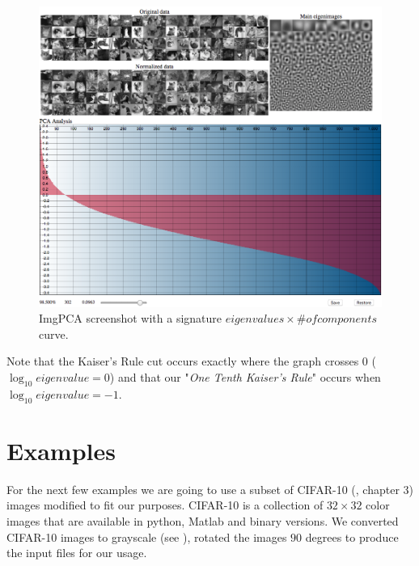 \documentclass{article} %
\begin{document}

\begin{figure}[h]
\begin{center}
\includegraphics[width=\textwidth]{imgPca.png}
\end{center}
\caption{ImgPCA screenshot with a signature $eigenvalues \times \#of components$ curve.}
\end{figure}
Note that the Kaiser's Rule cut occurs exactly where the graph crosses $0$ ($\log_{10} eigenvalue = 0$) and that our "\emph{One Tenth Kaiser's Rule}" occurs when $\log_{10} eigenvalue = -1$.
\section{Examples}
For the next few examples we are going to use a subset of CIFAR-10 (\citet{krizhevsky2009learning}, chapter 3) images modified to fit our purposes. CIFAR-10 is a collection of $32\times 32$ color images that are available in python, Matlab and binary versions. We converted CIFAR-10 images to grayscale (see ), rotated the images $90$ degrees to produce the input files for our usage.\par
\end{document}
